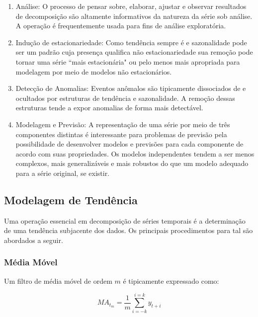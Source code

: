 \begin{enumerate}

    \item Análise: O processo de pensar sobre, elaborar, ajustar e observar
    resultados de decomposição são altamente informativos da natureza da
    série sob análise. A operação é frequentemente usada para fins de análise
    exploratória.

    \item Indução de estacionariedade: Como tendência sempre é e sazonalidade
    pode ser um padrão cuja presença qualifica não estacionariedade sua
    remoção pode tornar uma série ``mais estacionária" ou pelo menos mais
    apropriada para modelagem por meio de modelos não estacionários.

    \item Detecção de Anomalias: Eventos anômalos são tipicamente dissociados
    de e ocultados por estruturas de tendência e sazonalidade. A remoção
    dessas estruturas tende a expor anomalias de forma mais detectável.

    \item Modelagem e Previsão: A representação de uma série por meio de três
    componentes distintas é interessante para problemas de previsão pela
    possibilidade de desenvolver modelos e previsões para cada componente de
    acordo com suas propriedades. Os modelos independentes tendem a ser menos
    complexos, mais generalizáveis e mais robustos do que um modelo adequado
    para a série original, se existir.

\end{enumerate}

\subsection{Modelagem de Tendência}

Uma operação essencial em decomposição de séries temporais é a determinação
de uma tendência subjacente dos dados. Os principais procedimentos para tal
são abordados a seguir.

\subsubsection{Média Móvel}\label{sssec:MA(p)}

Um filtro de média móvel de ordem $m$ é tipicamente expressado como:

\begin{equation}\label{eq:ma}
    MA_{t_{m}} = \frac{1}{m} \sum_{i=-k}^{i=k} y_{t+i}
\end{equation}

